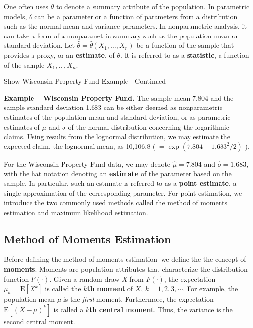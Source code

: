 \documentclass[]{book}
\theoremstyle{definition}
\theoremstyle{definition}
\theoremstyle{definition}
\theoremstyle{remark}
\begin{document}
One often uses \(\theta\) to denote a summary attribute of the
population. In parametric models, \(\theta\) can be a parameter or a
function of parameters from a distribution such as the normal mean and
variance parameters. In nonparametric analysis, it can take a form of a
nonparametric summary such as the population mean or standard deviation.
Let \(\hat{\theta} =\hat{\theta}(X_1, \ldots, X_n)\) be a function of
the sample that provides a proxy, or an \textbf{estimate}, of
\(\theta\). It is referred to as a \textbf{statistic}, a function of the
sample \(X_1, \ldots, X_n\).

Show Wisconsin Property Fund Example - Continued

\hypertarget{EXM:S1:PE}{}
\textbf{Example -- Wisconsin Property Fund.} The sample mean 7.804 and
the sample standard deviation 1.683 can be either deemed as
nonparametric estimates of the population mean and standard deviation,
or as parametric estimates of \(\mu\) and \(\sigma\) of the normal
distribution concerning the logarithmic claims. Using results from the
lognormal distribution, we may estimate the expected claim, the
lognormal mean, as 10,106.8 ( \(=\exp(7.804+1.683^2/2)\) ).

For the Wisconsin Property Fund data, we may denote \(\hat{\mu} =7.804\)
and \(\hat{\sigma} = 1.683\), with the hat notation denoting an
\textbf{estimate} of the parameter based on the sample. In particular,
such an estimate is referred to as a \textbf{point estimate}, a single
approximation of the corresponding parameter. For point estimation, we
introduce the two commonly used methods called the method of moments
estimation and maximum likelihood estimation.

\subsection{Method of Moments
Estimation}\label{method-of-moments-estimation}

Before defining the method of moments estimation, we define the the
concept of \textbf{moments}. Moments are population attributes that
characterize the distribution function \(F(\cdot)\). Given a random draw
\(X\) from \(F(\cdot)\), the expectation \(\mu_k=\mathrm{E}[X^k]\) is
called the \textbf{\(k\)th moment} of \(X\), \(k=1,2,3,\cdots\). For
example, the population mean \(\mu\) is the \emph{first} moment.
Furthermore, the expectation \(\mathrm{E}[(X-\mu)^k]\) is called a
\textbf{\(k\)th central moment}. Thus, the variance is the second
central moment.
\end{document}
